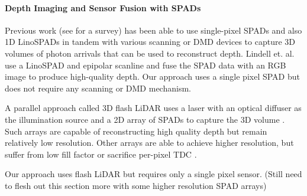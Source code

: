 
\paragraph{Depth Imaging and Sensor Fusion with SPADs}
Previous work (see \cite{Horaud2016} for a survey) has been able to use
single-pixel SPADs \cite{Lamb2010} and also 1D LinoSPADs in
tandem with various scanning or DMD devices to capture 3D volumes of photon arrivals
that can be used to reconstruct depth. Lindell et. al. \cite{Lindell2018} use a
LinoSPAD and epipolar scanline and fuse the SPAD data with an RGB image to
produce high-quality depth.  Our approach uses a single pixel SPAD but
does not require any scanning or DMD mechanism.

A parallel approach called 3D flash LiDAR uses a laser with an optical diffuser
as the illumination source and a 2D array of SPADs to capture the 3D volume
\cite{Stoppa2007, Niclass2005}. Such arrays are capable of reconstructing high
quality depth but remain relatively low resolution. Other arrays are able to
achieve higher resolution, but suffer from low fill factor \cite{Veerappan2011} or
sacrifice per-pixel TDC \cite{Zhang2018}.

Our approach uses flash LiDAR but requires only a single pixel 
sensor.
(Still need to flesh out this section more with some higher resolution SPAD arrays)

